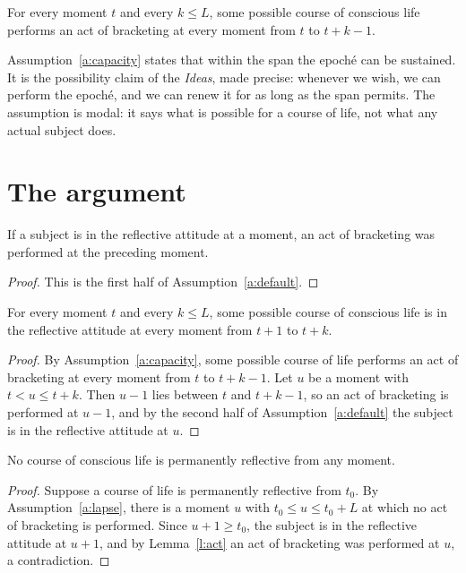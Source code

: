 \documentclass{situationist-preprint}
\begin{document}
\begin{assumption}[Capacity]\label{a:capacity}
For every moment $t$ and every $k \le L$, some possible course of conscious life performs an act of bracketing at every moment from $t$ to $t+k-1$.
\end{assumption}

Assumption~\ref{a:capacity} states that within the span the epoché can be sustained. It is the possibility claim of the \emph{Ideas}, made precise: whenever we wish, we can perform the epoché, and we can renew it for as long as the span permits. The assumption is modal: it says what is possible for a course of life, not what any actual subject does.

\section{The argument}\label{s:argument}

\begin{lemma}\label{l:act}
If a subject is in the reflective attitude at a moment, an act of bracketing was performed at the preceding moment.
\end{lemma}

\begin{proof}
This is the first half of Assumption~\ref{a:default}.
\end{proof}

\begin{theorem}[Sustainability]\label{t:sustain}
For every moment $t$ and every $k \le L$, some possible course of conscious life is in the reflective attitude at every moment from $t+1$ to $t+k$.
\end{theorem}

\begin{proof}
By Assumption~\ref{a:capacity}, some possible course of life performs an act of bracketing at every moment from $t$ to $t+k-1$. Let $u$ be a moment with $t < u \le t+k$. Then $u-1$ lies between $t$ and $t+k-1$, so an act of bracketing is performed at $u-1$, and by the second half of Assumption~\ref{a:default} the subject is in the reflective attitude at $u$.
\end{proof}

\begin{theorem}\label{t:nopermanent}
No course of conscious life is permanently reflective from any moment.
\end{theorem}

\begin{proof}
Suppose a course of life is permanently reflective from $t_0$. By Assumption~\ref{a:lapse}, there is a moment $u$ with $t_0 \le u \le t_0 + L$ at which no act of bracketing is performed. Since $u+1 \ge t_0$, the subject is in the reflective attitude at $u+1$, and by Lemma~\ref{l:act} an act of bracketing was performed at $u$, a contradiction.
\end{proof}
\end{document}
